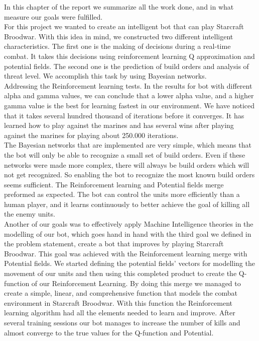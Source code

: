 In this chapter of the report we summarize all the work done, and in what measure our goals were fulfilled. \\

For this project we wanted to create an intelligent bot that can play Starcraft Broodwar. With this idea in mind, we constructed two different intelligent characteristics. The first one is the making of decisions during a real-time combat. It takes this decisions using reinforcement learning Q approximation and potential fields. The second one is the prediction of build orders and analysis of threat level. We accomplish this task by using Bayesian networks. \\

Addressing the Reinforcement learning tests. In the results for bot with different alpha and gamma values, we can conclude that a lower alpha value, and a higher gamma value is the best for learning fastest in our environment. We have noticed that it takes several hundred thousand of iterations before it converges. It has learned how to play against the marines and has several wins after playing against the marines for playing about 250.000 iterations. \\

The Bayesian networks that are implemented are very simple, which means that the bot will only be able to recognize a small set of build orders. Even if these networks were made more complex, there will always be build orders which will not get recognized. So enabling the bot to recognize the most known build orders seems sufficient. The Reinforcement learning and Potential fields merge preformed as expected. The bot can control the units more efficiently than a human player, and it learns continuously to better achieve the goal of killing all the enemy units. \\

Another of our goals was to effectively apply Machine Intelligence theories in the modelling of our bot, which goes hand in hand with the third goal we defined in the problem statement, create a bot that improves by playing Starcraft Broodwar. This goal was achieved with the Reinforcement learning merge with Potential fields. We started defining the potential fields' vectors for modelling the movement of our units and then using this completed product to create the Q-function of our Reinforcement Learning. By doing this merge we managed to create a simple, linear, and comprehensive function that models the combat environment in Starcraft Broodwar. With this function the Reinforcement learning algorithm had all the elements needed to learn and improve. After several training sessions our bot manages to increase the number of kills and almost converge to the true values for the Q-function and Potential.\\

